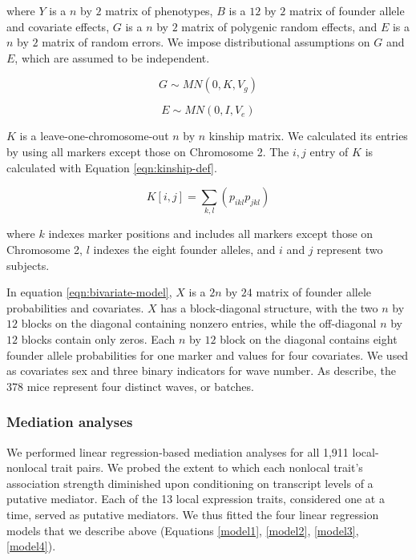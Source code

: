 \documentclass{article}
\begin{document}
where $Y$ is a $n$ by $2$ matrix of phenotypes, $B$ is a $12$ by $2$ matrix of founder allele and covariate effects, $G$ is a $n$ by $2$ matrix of polygenic random effects, and $E$ is a $n$ by $2$ matrix of random errors. We impose distributional assumptions on $G$ and $E$, which are assumed to be independent.

\begin{equation}
    G \sim MN(0, K, V_g)
\end{equation}

\begin{equation}
    E \sim MN(0, I, V_e)
\end{equation}

$K$ is a leave-one-chromosome-out $n$ by $n$ kinship matrix. We calculated its entries by using all markers except those on Chromosome 2. The $i, j$ entry of $K$ is calculated with Equation \ref{eqn:kinship-def}.

\begin{equation}
    K[i, j] = \sum_{k,l} (p_{ikl} p_{jkl})
    \label{eqn:kinship-def}
\end{equation}

where $k$ indexes marker positions and includes all markers except those on Chromosome 2, $l$ indexes the eight founder alleles, and $i$ and $j$ represent two subjects. 

In equation \ref{eqn:bivariate-model}, $X$ is a $2n$ by $24$ matrix of founder allele probabilities and covariates. $X$ has a block-diagonal structure, with the two $n$ by $12$ blocks on the diagonal containing nonzero entries, while the off-diagonal $n$ by $12$ blocks contain only zeros. Each $n$ by $12$ block on the diagonal contains eight founder allele probabilities for one marker and values for four covariates. We used as covariates sex and three binary indicators for wave number. As \citet{keller2018genetic} describe, the 378 mice represent four distinct waves, or batches.

\subsubsection{Mediation analyses}

We performed linear regression-based mediation analyses for all 1,911 local-nonlocal trait pairs. We probed the extent to which each nonlocal trait's association strength diminished upon conditioning on transcript levels of a putative mediator. Each of the 13 local expression traits, considered one at a time, served as putative mediators. We thus fitted the four linear regression models that we describe above (Equations \ref{model1}, \ref{model2}, \ref{model3}, \ref{model4}). 
\end{document}

